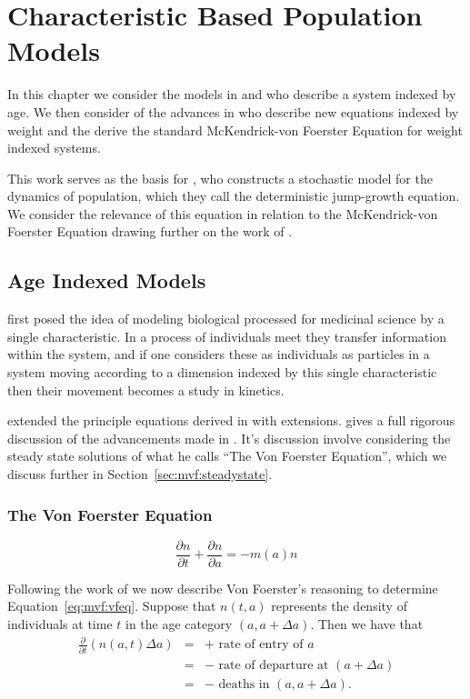 \documentclass[../main.tex]{subfiles}
\begin{document}
  \chapter{Characteristic Based Population Models}\label{chapter:derivation}

  In this chapter we consider the models in \cite{mckendrick1926} and \cite{foerster1959} who describe a system indexed by age. We then consider of the advances in \cite{silvert1978} who describe new equations indexed by weight and the derive the standard McKendrick-von Foerster Equation for weight indexed systems.

  This work serves as the basis for \cite{datta2010}, who constructs a stochastic model for the dynamics of population, which they call the deterministic jump-growth equation. We consider the relevance of this equation in relation to the McKendrick-von Foerster Equation drawing further on the work of \cite{datta2010}.

  \section{Age Indexed Models}
  \cite{mckendrick1926} first posed the idea of modeling biological processed for medicinal science by a single characteristic. In a process of individuals meet they transfer information within the system, and if one considers these as individuals as particles in a system moving according to a dimension indexed by this single characteristic then their movement becomes a study in kinetics.

  \cite{foerster1959} extended the principle equations derived in \cite{mckendrick1926} with extensions. \cite{trucco1965} gives a full rigorous discussion of the advancements made in \cite{foerster1959}. It's discussion involve considering the steady state solutions of what he calls ``The Von Foerster Equation'', which we discuss further in Section~\ref{sec:mvf:steadystate}.

  \subsection{The Von Foerster Equation}
  \begin{equation}\label{eq:mvf:vfeq}
    \frac{\partial n}{\partial t} + \frac{\partial n}{\partial a} = - m(a)n
  \end{equation}

  Following the work of \cite{trucco1965} we now describe Von Foerster's reasoning to determine Equation~\ref{eq:mvf:vfeq}. Suppose that $n(t, a)$ represents the density of individuals at time $t$ in the age category $(a, a + \Delta a)$. Then we have that
  \begin{eqnarray}\label{eq:mvf:derivword}
    \frac{\partial}{\partial t} \left( n(a, t) \Delta a \right)
    &=& + \mbox{ rate of entry of } a \nonumber \\
    &=& - \mbox{ rate of departure at } (a + \Delta a) \nonumber \\
    &=& - \mbox{ deaths in } (a, a + \Delta a).
  \end{eqnarray}
\end{document}

